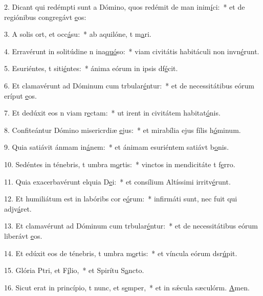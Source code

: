 2. Dicant qui redémpti sunt a Dómino, quos redémit de man inim\uline{í}ci:~* et de regiónibus congregávt \uline{e}os:\par 
3. A solis ort, et occ\uline{á}su:~* ab aquilóne, t m\uline{a}ri.\par 
4. Erravérunt in solitúdine n ina\uline{quó}so:~* viam civitátis habitáculi non invn\uline{é}runt.\par 
5. Esuriéntes, t siti\uline{é}ntes:~* ánima eórum in ipsis df\uline{é}cit.\par 
6. Et clamavérunt ad Dóminum cum trbular\uline{é}ntur:~* et de necessitátibus eórum eríput \uline{e}os.\par 
7. Et dedúxit eos n viam r\uline{e}ctam:~* ut irent in civitátem habitat\uline{ó}nis.\par 
8. Confiteántur Dómino misericrdiæ \uline{e}jus:~* et mirabília ejus fílis h\uline{ó}minum.\par 
9. Quia satiávit ánmam in\uline{á}nem:~* et ánimam esuriéntem satiávt b\uline{o}nis.\par 
10. Sedéntes in ténebris, t umbra m\uline{o}rtis:~* vinctos in mendicitáte t f\uline{e}rro.\par 
11. Quia exacerbavérunt elquia D\uline{e}i:~* et consílium Altíssimi irritv\uline{é}runt.\par 
12. Et humiliátum est in labóribs cor e\uline{ó}rum:~* infirmáti sunt, nec fuit qui adjv\uline{á}ret.\par 
13. Et clamavérunt ad Dóminum cum trbular\uline{é}ntur:~* et de necessitátibus eórum liberávt \uline{e}os.\par 
14. Et edúxit eos de ténebris, t umbra m\uline{o}rtis:~* et víncula eórum dsr\uline{ú}pit.\par 
15. Glória Ptri, et F\uline{í}lio,~* et Spirítu S\uline{a}ncto.\par 
16. Sicut erat in princípio, t nunc, et s\uline{e}mper,~* et in sǽcula sæculórm. \uline{A}men.\par 
